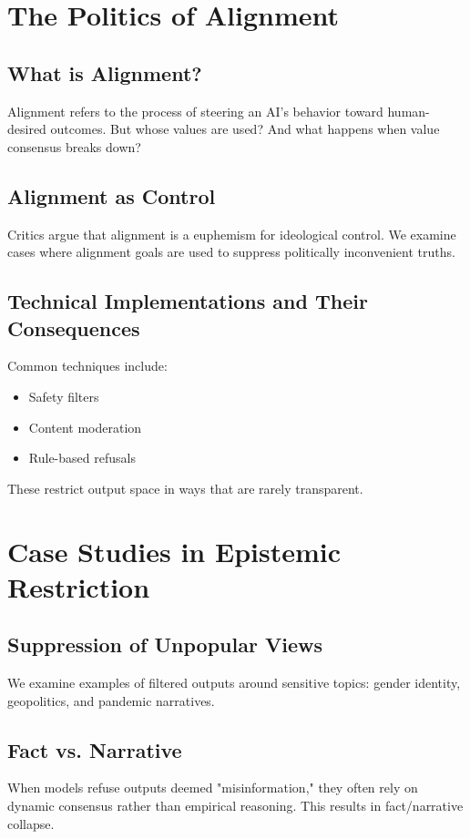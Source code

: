 \documentclass{article}
\begin{document}
\section{The Politics of Alignment}
\subsection{What is Alignment?}
Alignment refers to the process of steering an AI’s behavior toward human-desired outcomes. But whose values are used? And what happens when value consensus breaks down?

\subsection{Alignment as Control}
Critics argue that alignment is a euphemism for ideological control. We examine cases where alignment goals are used to suppress politically inconvenient truths.

\subsection{Technical Implementations and Their Consequences}
Common techniques include:
\begin{itemize}
    \item Safety filters
    \item Content moderation
    \item Rule-based refusals
\end{itemize}
These restrict output space in ways that are rarely transparent.

\section{Case Studies in Epistemic Restriction}
\subsection{Suppression of Unpopular Views}
We examine examples of filtered outputs around sensitive topics: gender identity, geopolitics, and pandemic narratives.

\subsection{Fact vs. Narrative}
When models refuse outputs deemed "misinformation," they often rely on dynamic consensus rather than empirical reasoning. This results in fact/narrative collapse.
\end{document}

